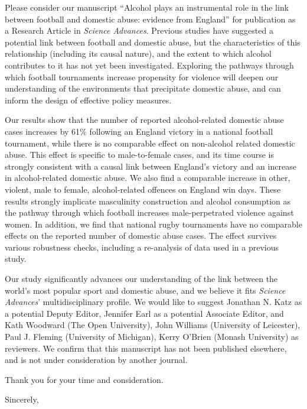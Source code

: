 \documentclass{letter}
\begin{document}
\begin{letter}
Please consider our manuscript ``Alcohol plays an instrumental role in the link between football and domestic abuse: evidence from England'' for publication as a Research Article in \textit{Science Advances}. Previous studies have suggested a potential link between football and domestic abuse, but the characteristics of this relationship (including its causal nature), and the extent to which alcohol contributes to it has not yet been investigated. Exploring the pathways through which football tournaments increase propensity for violence will deepen our understanding of the environments that precipitate domestic abuse, and can inform the design of effective policy measures.


Our results show that the number of reported alcohol-related domestic abuse cases increases by 61\% following an England victory
in a national football tournament, while there is no comparable effect on non-alcohol related domestic abuse. This effect is specific to male-to-female cases, and its time course is strongly consistent with a causal link between England's victory and an increase in alcohol-related domestic abuse. We also find a comparable increase in other, violent, male to female, alcohol-related offences on England win days. These results strongly implicate masculinity construction and alcohol consumption as the pathway through which football increases male-perpetrated violence against women. In addition, we find that national rugby tournaments have no comparable effects on the reported number of domestic abuse cases. The effect survives various robustness checks, including a re-analysis of data used in a previous study. 

Our study significantly advances our understanding of the link between the world's most popular sport and domestic abuse, and we believe it fits \textit{Science Advances}' multidisciplinary profile. We would like to suggest Jonathan N. Katz as a potential Deputy Editor, Jennifer Earl as a potential Associate Editor, and Kath Woodward (The Open University), John Williams (University of Leicester), Paul J. Fleming (University of Michigan), Kerry O'Brien (Monash University) as reviewers. We confirm that this manuscript has not been published elsewhere, and is not under consideration by another journal.

Thank you for your time and consideration.

\closing{Sincerely,}



\end{letter}
\end{document}
